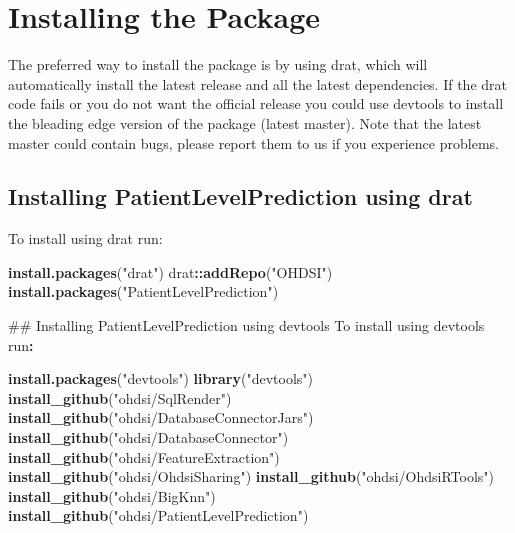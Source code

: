 \documentclass[]{article}
\newenvironment{Shaded}{\begin{snugshade}}{\end{snugshade}}
\newcommand{\KeywordTok}[1]{\textcolor[rgb]{0.13,0.29,0.53}{\textbf{#1}}}
\newcommand{\StringTok}[1]{\textcolor[rgb]{0.31,0.60,0.02}{#1}}
\newcommand{\OperatorTok}[1]{\textcolor[rgb]{0.81,0.36,0.00}{\textbf{#1}}}
\newcommand{\NormalTok}[1]{#1}
\begin{document}
\section{Installing the Package}\label{installing-the-package}

The preferred way to install the package is by using drat, which will
automatically install the latest release and all the latest
dependencies. If the drat code fails or you do not want the official
release you could use devtools to install the bleading edge version of
the package (latest master). Note that the latest master could contain
bugs, please report them to us if you experience problems.

\subsection{Installing PatientLevelPrediction using
drat}\label{installing-patientlevelprediction-using-drat}

To install using drat run:

\begin{Shaded}
\begin{Highlighting}[]
\KeywordTok{install.packages}\NormalTok{(}\StringTok{"drat"}\NormalTok{)}
\NormalTok{drat}\OperatorTok{::}\KeywordTok{addRepo}\NormalTok{(}\StringTok{"OHDSI"}\NormalTok{)}
\KeywordTok{install.packages}\NormalTok{(}\StringTok{"PatientLevelPrediction"}\NormalTok{)}

\NormalTok{## Installing PatientLevelPrediction using devtools}
\NormalTok{To install using devtools run}\OperatorTok{:}
\end{Highlighting}
\end{Shaded}

\begin{Shaded}
\begin{Highlighting}[]
\KeywordTok{install.packages}\NormalTok{(}\StringTok{"devtools"}\NormalTok{)}
\KeywordTok{library}\NormalTok{(}\StringTok{"devtools"}\NormalTok{)}
\KeywordTok{install_github}\NormalTok{(}\StringTok{"ohdsi/SqlRender"}\NormalTok{) }
\KeywordTok{install_github}\NormalTok{(}\StringTok{"ohdsi/DatabaseConnectorJars"}\NormalTok{) }
\KeywordTok{install_github}\NormalTok{(}\StringTok{"ohdsi/DatabaseConnector"}\NormalTok{) }
\KeywordTok{install_github}\NormalTok{(}\StringTok{"ohdsi/FeatureExtraction"}\NormalTok{)}
\KeywordTok{install_github}\NormalTok{(}\StringTok{"ohdsi/OhdsiSharing"}\NormalTok{) }
\KeywordTok{install_github}\NormalTok{(}\StringTok{"ohdsi/OhdsiRTools"}\NormalTok{) }
\KeywordTok{install_github}\NormalTok{(}\StringTok{"ohdsi/BigKnn"}\NormalTok{)  }
\KeywordTok{install_github}\NormalTok{(}\StringTok{"ohdsi/PatientLevelPrediction"}\NormalTok{) }
\end{Highlighting}
\end{Shaded}
\end{document}
